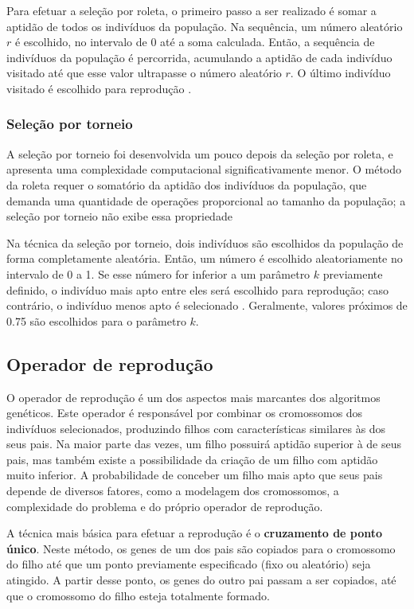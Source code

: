 \documentclass[12pt]{article}
\begin{document}
Para efetuar a seleção por roleta, o primeiro passo a ser realizado é somar a aptidão de todos os indivíduos da população. Na sequência, um número aleatório $r$ é escolhido, no intervalo de 0 até a soma calculada. Então, a sequência de indivíduos da população é percorrida, acumulando a aptidão de cada indivíduo visitado até que esse valor ultrapasse o número aleatório $r$. O último indivíduo visitado é escolhido para reprodução \cite{Mitchell1998}.

\subsubsection{Seleção por torneio} \label{sec:tournament}

A seleção por torneio foi desenvolvida um pouco depois da seleção por roleta, e apresenta uma complexidade computacional significativamente menor. O método da roleta requer o somatório da aptidão dos indivíduos da população, que demanda uma quantidade de operações proporcional ao tamanho da população; a seleção por torneio não exibe essa propriedade

Na técnica da seleção por torneio, dois indivíduos são escolhidos da população de forma completamente aleatória. Então, um número é escolhido aleatoriamente no intervalo de 0 a 1. Se esse número for inferior a um parâmetro $k$ previamente definido, o indivíduo mais apto entre eles será escolhido para reprodução; caso contrário, o indivíduo menos apto é selecionado \cite{Mitchell1998}. Geralmente, valores próximos de 0.75 são escolhidos para o parâmetro $k$.

\subsection{Operador de reprodução} \label{sec:crossover}

O operador de reprodução é um dos aspectos mais marcantes dos algoritmos genéticos. Este operador é responsável por combinar os cromossomos dos indivíduos selecionados, produzindo filhos com características similares às dos seus pais. Na maior parte das vezes, um filho possuirá aptidão superior à de seus pais, mas também existe a possibilidade da criação de um filho com aptidão muito inferior. A probabilidade de conceber um filho mais apto que seus pais depende de diversos fatores, como a modelagem dos cromossomos, a complexidade do problema e do próprio operador de reprodução.

A técnica mais básica para efetuar a reprodução é o \textbf{cruzamento de ponto único}. Neste método, os genes de um dos pais são copiados para o cromossomo do filho até que um ponto previamente especificado (fixo ou aleatório) seja atingido. A partir desse ponto, os genes do outro pai passam a ser copiados, até que o cromossomo do filho esteja totalmente formado.
\end{document}
